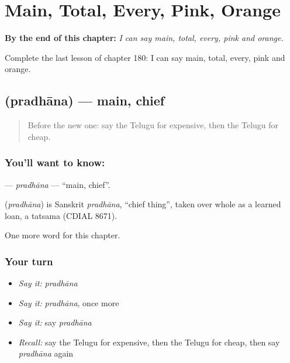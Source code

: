 
\chapter{Main, Total, Every, Pink, Orange}
\label{ch:te-main-total-every-pink-orange}

\begin{chapteropening}
\textbf{By the end of this chapter:} \emph{I can say main, total, every, pink and orange.}

Complete the last lesson of chapter 180: I can say main, total, every, pink and orange.
\end{chapteropening}

\section[\texorpdfstring{\te{ప్రధాన} (pradhāna)}{ప్రధాన (pradhāna)}]{ (pradhāna) — main, chief}

\label{lesson:TE-C180-pradhana}



\begin{quote}
Before the new one: say the Telugu for expensive, then the Telugu for cheap.
\end{quote}

\subsection*{You'll want to know: }
\textbf{} — \emph{pradhāna} — \textquotedblleft{}main, chief\textquotedblright{}.

\begin{cousinweb}
\textbf{} (\emph{pradhāna}) is Sanskrit \emph{pradhāna}, \textquotedblleft{}chief thing\textquotedblright{}, taken over whole as a learned loan, a tatsama (CDIAL 8671).
\end{cousinweb}

\begin{grammarlens}[title={What you've built}]
One more word for this chapter.
\end{grammarlens}

\subsection*{Your turn}
\begin{itemize}
\raggedright
  \item \emph{Say it:} \emph{pradhāna}
  \item \emph{Say it:} \emph{pradhāna}, once more
  \item \emph{Say it:} say \emph{pradhāna}
  \item \emph{Recall:} say the Telugu for expensive, then the Telugu for cheap, then say \emph{pradhāna} again
\end{itemize}

